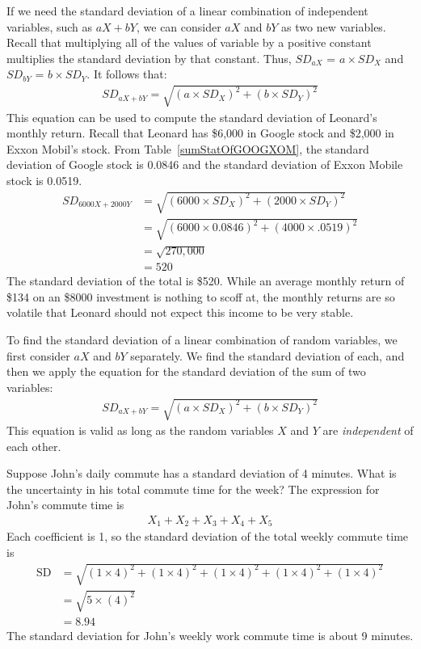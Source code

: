 If we need the standard deviation of a linear combination of independent variables, such as $aX + bY$, we can consider $aX$ and $bY$ as two new variables. Recall that multiplying all of the values of variable by a positive constant multiplies the standard deviation by that constant. Thus, $SD_{aX}$ =  $a \times SD_X$ and $SD_{bY}$ =  $b \times SD_Y$. It follows that:
\begin{align*}
SD_{aX + bY} = \sqrt{(a \times SD_X)^2 + (b \times SD_Y)^2}
\end{align*}
This equation can be used to compute the standard deviation of Leonard's monthly return. Recall that Leonard has \$6,000 in Google stock and \$2,000 in Exxon Mobil's stock. From Table~\ref{sumStatOfGOOGXOM}, the standard deviation of Google stock is 0.0846 and the standard deviation of Exxon Mobile stock is 0.0519.
\begin{align*}
SD_{6000X + 2000Y}
	&= \sqrt{(6000\times SD_X)^2 + (2000\times SD_Y)^2} \\
	&= \sqrt{(6000\times 0.0846)^2 + (4000\times .0519)^2} \\
	&= \sqrt{270,000} \\
	&= 520
\end{align*}
The standard deviation of the total is \$520. While an average monthly return of \$134 on an \$8000 investment is nothing to scoff at, the monthly returns are so volatile that Leonard should not expect this income to be very stable.

\begin{termBox}{
To find the standard deviation of a linear combination of random variables, we first consider $aX$ and $bY$ separately. We find the standard deviation of each, and then we apply the equation for the standard deviation of the sum of two variables:
\begin{align*}
SD_{aX + bY} = \sqrt{(a\times SD_X)^2 + (b\times SD_Y)^2}
\end{align*}
This equation is valid as long as the random variables $X$ and $Y$ are \emph{independent} of each other.}
\end{termBox}

\begin{example}{Suppose John's daily commute has a standard deviation of 4 minutes. What is the uncertainty in his total commute time for the week?} \label{sdOfJohnsCommuteWeeklyTime}
The expression for John's commute time is
\begin{align*}
X_1 + X_2 + X_3 + X_4 + X_5
\end{align*}
Each coefficient is 1, so the standard deviation of the total weekly commute time is
\begin{align*}
\text{SD}&= \sqrt{(1 \times 4)^2 + (1 \times 4)^2 + (1 \times 4)^2 + (1 \times 4)^2 + (1 \times 4)^2} \\
&= \sqrt{5\times (4)^2} \\
&= 8.94
\end{align*}
The standard deviation for John's weekly work commute time is about 9 minutes.
\end{example}

